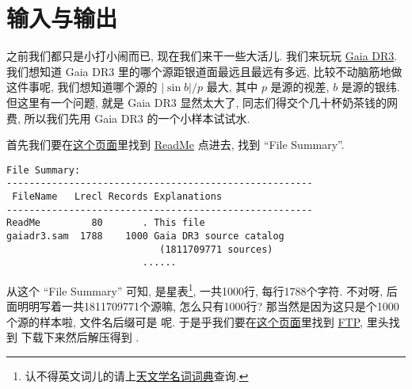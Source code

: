 \chapter{输入与输出}\label{io}

之前我们都只是小打小闹而已, 现在我们来干一些大活儿. 我们来玩玩 \href{https://cdsarc.cds.unistra.fr/viz-bin/cat/I/355}{Gaia DR3}. 我们想知道 Gaia DR3 里的哪个源距银道面最远且最远有多远, 比较不动脑筋地做这件事呢, 我们想知道哪个源的 $ \left\lvert \sin b\right\rvert/p $ 最大, 其中 $ p $ 是源的视差, $ b $ 是源的银纬. 但这里有一个问题, 就是 Gaia DR3 显然太大了, 同志们得交个几十杯奶茶钱的网费, 所以我们先用 Gaia DR3 的一个小样本试试水. 

首先我们要在\href{https://cdsarc.cds.unistra.fr/viz-bin/cat/I/355}{这个页面}里找到 \href{https://cdsarc.cds.unistra.fr/viz-bin/ReadMe/I/355?format=html&tex=true}{ReadMe} 点进去, 找到 ``File Summary''. 
\begin{lstlisting}[numbers=none]
File Summary:
------------------------------------------------------
 FileName   Lrecl Records Explanations
------------------------------------------------------
ReadMe         80       . This file
gaiadr3.sam  1788    1000 Gaia DR3 source catalog
                           (1811709771 sources)
                        ...... 
\end{lstlisting}
从这个 ``File Summary'' 可知,  是星表\footnote{认不得英文词儿的请上\href{https://nadc. china-vo. org/astrodict/}{天文学名词词典}查询.}, 一共1000行, 每行1788个字符. 不对呀, 后面明明写着一共1811709771个源嘛, 怎么只有1000行? 那当然是因为这只是个1000个源的样本啦, 文件名后缀可是   呢. 于是乎我们要在\href{https://cdsarc.cds.unistra.fr/viz-bin/cat/I/355}{这个页面}里找到 \href{https://cdsarc.cds.unistra.fr/ftp/I/355}{FTP}, 里头找到 \href{https://cdsarc.cds.unistra.fr/ftp/I/355/gaiadr3.sam.gz}{} 下载下来然后解压得到  . 


